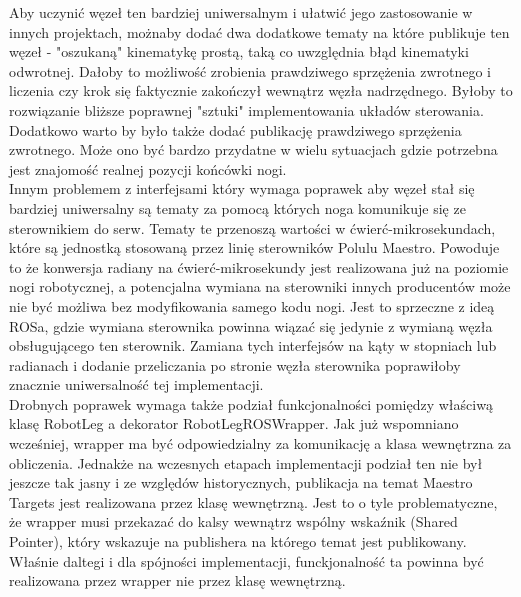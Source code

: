 Aby uczynić węzeł ten bardziej uniwersalnym i ułatwić jego zastosowanie w innych projektach, możnaby dodać dwa dodatkowe tematy na które publikuje ten węzeł - "oszukaną" kinematykę prostą, taką co uwzględnia błąd kinematyki odwrotnej. Dałoby to możliwość zrobienia prawdziwego sprzężenia zwrotnego i liczenia czy krok się faktycznie zakończył wewnątrz węzła nadrzędnego. Byłoby to rozwiązanie bliższe poprawnej "sztuki" implementowania układów sterowania. Dodatkowo warto by było także dodać publikację prawdziwego sprzężenia zwrotnego. Może ono być bardzo przydatne w wielu sytuacjach gdzie potrzebna jest znajomość realnej pozycji końcówki nogi.\\

Innym problemem z interfejsami który wymaga poprawek aby węzeł stał się bardziej uniwersalny są tematy za pomocą których noga komunikuje się ze sterownikiem do serw. Tematy te przenoszą wartości w ćwierć-mikrosekundach, które są jednostką stosowaną przez linię sterowników Polulu Maestro. Powoduje to że konwersja radiany na ćwierć-mikrosekundy jest realizowana już na poziomie nogi robotycznej, a potencjalna wymiana na sterowniki innych producentów może nie być możliwa bez modyfikowania samego kodu nogi. Jest to sprzeczne z ideą ROSa, gdzie wymiana sterownika powinna wiązać się jedynie z wymianą węzła obsługującego ten sterownik. Zamiana tych interfejsów na kąty w stopniach lub radianach i dodanie przeliczania po stronie węzła sterownika poprawiłoby znacznie uniwersalność tej implementacji.\\

Drobnych poprawek wymaga także podział funkcjonalności pomiędzy właściwą klasę RobotLeg a dekorator RobotLegROSWrapper. Jak już wspomniano wcześniej, wrapper ma być odpowiedzialny za komunikację a klasa wewnętrzna za obliczenia. Jednakże na wczesnych etapach implementacji podział ten nie był jeszcze tak jasny i ze względów historycznych, publikacja na temat Maestro Targets jest realizowana przez klasę wewnętrzną. Jest to o tyle problematyczne, że wrapper musi przekazać do kalsy wewnątrz wspólny wskaźnik (Shared Pointer), który wskazuje na publishera na którego temat jest publikowany. Właśnie daltegi i dla spójności implementacji, funckjonalność ta powinna być realizowana przez wrapper nie przez klasę wewnętrzną.\\